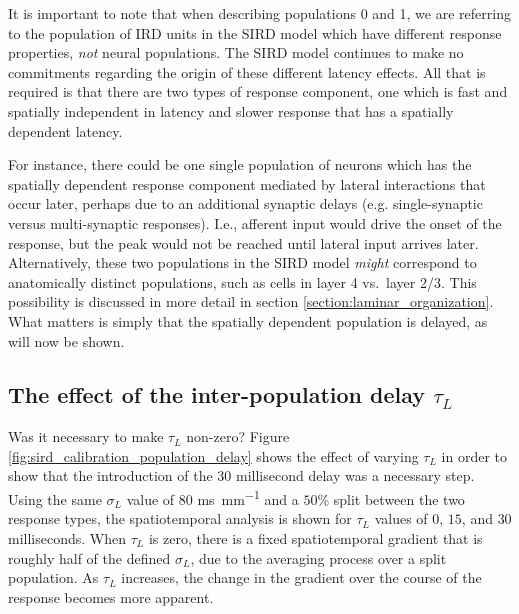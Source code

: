 \documentclass[phd,ianc,twoside]{infthesis}
\begin{document}
It is important to note that when describing populations 0 and 1, we are
referring to the population of IRD units in the SIRD model which have
different response properties, \emph{not} neural populations. The SIRD
model continues to make no commitments regarding the origin of these
different latency effects. All that is required is that there are two
types of response component, one which is fast and spatially independent
in latency and slower response that has a spatially dependent latency.

For instance, there could be one single population of neurons which has
the spatially dependent response component mediated by lateral
interactions that occur later, perhaps due to an additional synaptic
delays (e.g. single-synaptic versus multi-synaptic
responses).  I.e., afferent input would drive the onset of the
response, but the peak would not be reached until lateral input
arrives later.
Alternatively, these two populations in the SIRD model
\emph{might} correspond to anatomically distinct populations, such as
cells in layer 4 vs.\ layer 2/3. This possibility
is discussed in more detail in section
\ref{section:laminar_organization}. What matters is simply that the
spatially dependent population is delayed, as will now be shown.

\subsection{The effect of the inter-population delay $\tau_L$}

Was it necessary to make $\tau_L$ non-zero? Figure
\ref{fig:sird_calibration_population_delay} shows the effect of varying
$\tau_L$ in order to show that the introduction of the $30$ millisecond
delay was a necessary step. Using the same $\sigma_L$ value of $80$
\si{ms.mm^{-1}} and a $50\%$ split between the two response types, the
spatiotemporal analysis is shown for $\tau_L$ values of $0$, $15$, and 
$30$ milliseconds. When $\tau_L$ is zero, there is a fixed
spatiotemporal gradient that is roughly half of the defined $\sigma_L$,
due to the averaging process over a split population. As $\tau_L$
increases, the change in the gradient over the course of the response
becomes more apparent.
\end{document}
